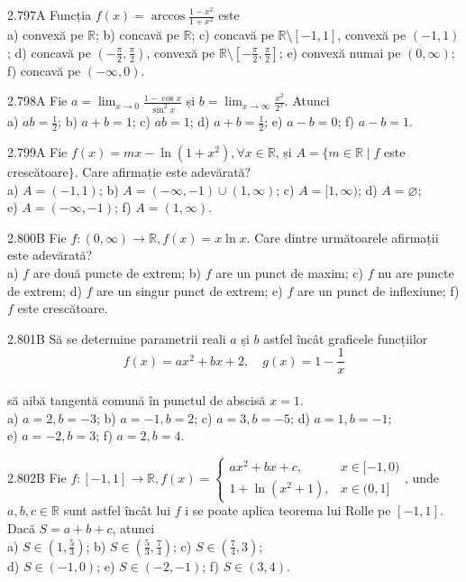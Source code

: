 \documentclass[11pt]{article}
\begin{document}
2.797A Funcția $f(x)=\arccos \frac{1-x^{2}}{1+x^{2}}$ este\\ a) convexă pe $\mathbb{R}$; b) concavă pe $\mathbb{R}$; c) concavă pe $\mathbb{R} \setminus[-1,1]$, convexă pe $(-1,1)$; d) concavă pe $\left(-\frac{\pi}{2}, \frac{\pi}{2}\right)$, convexă pe $\mathbb{R} \setminus\left[-\frac{\pi}{2}, \frac{\pi}{2}\right]$; e) convexă numai pe $(0, \infty)$; f) concavă pe $(-\infty, 0)$.

2.798A Fie $a=\lim _{x \rightarrow 0} \frac{1-\cos x}{\sin ^{2} x}$ și $b=\lim _{x \rightarrow \infty} \frac{x^{2}}{2^{x}}$. Atunci\\ a) $a b=\frac{1}{2}$; b) $a+b=1$; c) $a b=1$; d) $a+b=\frac{1}{2}$; e) $a-b=0$; f) $a-b=1$.

2.799A Fie $f(x)=m x-\ln \left(1+x^{2}\right), \forall x \in \mathbb{R}$, și $A=\{m \in \mathbb{R} \mid f$ este crescătoare$\}$. Care afirmație este adevărată?\\ a) $A=(-1,1)$; b) $A=(-\infty,-1) \cup(1, \infty)$; c) $A=[1, \infty)$; d) $A=\varnothing$;\\ e) $A=(-\infty,-1)$; f) $A=(1, \infty)$. 

2.800B Fie $f:(0, \infty) \rightarrow \mathbb{R}, f(x)=x \ln x$. Care dintre următoarele afirmații este adevărată?\\ a) $f$ are două puncte de extrem; b) $f$ are un punct de maxim; c) $f$ nu are puncte de extrem; d) $f$ are un singur punct de extrem; e) $f$ are un punct de inflexiune; f) $f$ este crescătoare.

2.801B Să se determine parametrii reali $a$ și $b$ astfel încât graficele funcțiilor $$f(x)=a x^{2}+b x+2, \quad g(x)=1-\frac{1}{x}$$\\să aibă tangentă comună în punctul de abscisă $x=1$.\\ a) $a=2, b=-3$; b) $a=-1, b=2$; c) $a=3, b=-5$; d) $a=1, b=-1$;\\ e) $a=-2, b=3$; f) $a=2, b=4$.

2.802B Fie $f:[-1,1] \rightarrow \mathbb{R}, f(x)= \begin{cases}a x^{2}+b x+c, & x \in[-1,0) \\ 1+\ln \left(x^{2}+1\right), & x \in(0,1]\end{cases}$, unde $a, b, c \in \mathbb{R}$ sunt astfel încât lui $f$ i se poate aplica teorema lui Rolle pe $[-1,1]$. Dacă $S=a+b+c$, atunci\\ a) $S \in\left(1, \frac{5}{3}\right)$; b) $S \in\left(\frac{5}{3}, \frac{7}{4}\right)$; c) $S \in\left(\frac{7}{4}, 3\right)$;\\ d) $S \in(-1,0)$; e) $S \in(-2,-1)$; f) $S \in(3,4)$.
\end{document}
